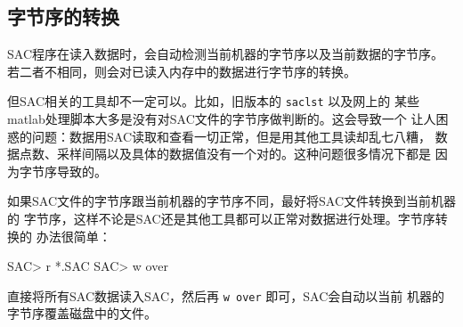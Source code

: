 \subsection{字节序的转换}
SAC程序在读入数据时，会自动检测当前机器的字节序以及当前数据的字节序。
若二者不相同，则会对已读入内存中的数据进行字节序的转换。

但SAC相关的工具却不一定可以。比如，旧版本的 \texttt{saclst} 以及网上的
某些matlab处理脚本大多是没有对SAC文件的字节序做判断的。这会导致一个
让人困惑的问题：数据用SAC读取和查看一切正常，但是用其他工具读却乱七八糟，
数据点数、采样间隔以及具体的数据值没有一个对的。这种问题很多情况下都是
因为字节序导致的。

如果SAC文件的字节序跟当前机器的字节序不同，最好将SAC文件转换到当前机器的
字节序，这样不论是SAC还是其他工具都可以正常对数据进行处理。字节序转换的
办法很简单：
\begin{SACCode}
SAC> r *.SAC
SAC> w over
\end{SACCode}
直接将所有SAC数据读入SAC，然后再 \texttt{w over} 即可，SAC会自动以当前
机器的字节序覆盖磁盘中的文件。
